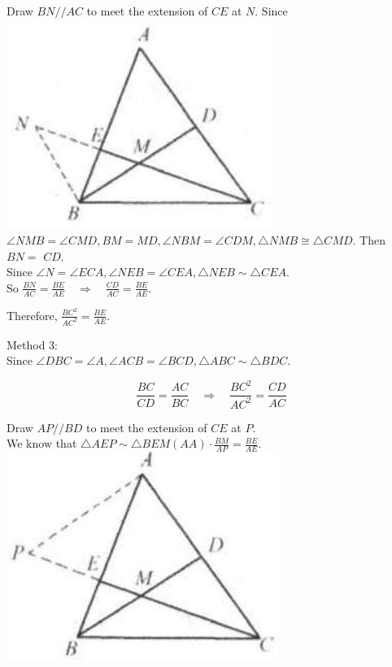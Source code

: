 \documentclass[10pt]{article}
\begin{document}
Draw \(B N / / A C\) to meet the extension of \(C E\) at \(N\). Since\\
\includegraphics[max width=\textwidth]{2025_04_17_97bc1f7e44d93c271a88g-115(2)} \(\angle N M B=\angle C M D, B M=M D, \angle N B M=\angle C D M, \triangle N M B \cong \triangle C M D\). Then \(B N=\) \(C D\).\\
Since \(\angle N=\angle E C A, \angle N E B=\angle C E A, \triangle N E B \sim \triangle C E A\).\\
So \(\frac{B N}{A C}=\frac{B E}{A E} \quad \Rightarrow \quad \frac{C D}{A C}=\frac{B E}{A E}\).


Therefore, \(\frac{B C^{2}}{A C^{2}}=\frac{B E}{A E}\).

Method 3:\\
Since \(\angle D B C=\angle A, \angle A C B=\angle B C D, \triangle A B C \sim \triangle B D C\).

\[
\frac{B C}{C D}=\frac{A C}{B C} \quad \Rightarrow \quad \frac{B C^{2}}{A C^{2}}=\frac{C D}{A C}
\]

Draw \(A P / / B D\) to meet the extension of \(C E\) at \(P\).\\
We know that \(\triangle A E P \sim \triangle B E M(A A) \cdot \frac{B M}{A P}=\frac{B E}{A E}\).\\
\includegraphics[max width=\textwidth, center]{2025_04_17_97bc1f7e44d93c271a88g-116}
\end{document}
